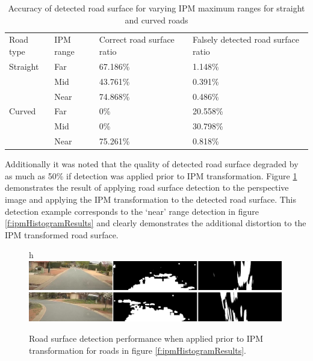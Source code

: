 \documentclass[]{aiaa-tc}%
\begin{document}
\begin{table}[]
	\begin{tabular}{llll}
		Road type & IPM range & Correct road surface ratio & Falsely detected road surface ratio \\
		Straight  & Far       & 67.186\%                   & 1.148\%                             \\
		& Mid       & 43.761\%                   & 0.391\%                             \\
		& Near      & 74.868\%                   & 0.486\%                             \\
		Curved    & Far       & 0\%                        & 20.558\%                            \\
		& Mid       & 0\%                        & 30.798\%                            \\
		& Near      & 75.261\%                   & 0.818\%                            
	\end{tabular}
	\caption{Accuracy of detected road surface for varying IPM maximum ranges for straight and curved roads}
	\label{t:ipmRangeRoadSurface}
\end{table}

Additionally it was noted that the quality of detected road surface degraded by as much as 50\% if detection was applied prior to IPM transformation. Figure \ref{f:ipmHistorgramReverse} demonstrates the result of applying road surface detection to the perspective image and applying the IPM transformation to the detected road surface. This detection example corresponds to the `near' range detection in figure \ref{f:ipmHistogramResults} and clearly demonstrates the additional distortion to the IPM transformed road surface.


\begin{figure}{h}
	\centering
	\includegraphics[width=0.99\textwidth]{Results/ipmHistorgramReverse.png}
	\caption{Road surface detection performance when applied prior to IPM transformation for roads in figure \ref{f:ipmHistogramResults}.}
	\label{f:ipmHistorgramReverse}
\end{figure}

%
\end{document}
